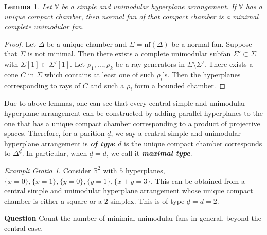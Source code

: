 \documentclass[12pt, a4paper]{article}
\newtheorem{lem}[theorem]{Lemma}
\theoremstyle{definition}
\theoremstyle{remark}
\newtheorem{example}{Exampli Gratia}[section]
\renewcommand{\emph}[1]{\textit{\textbf{#1}}}
\begin{document}
\begin{lem}
    Let $\mathbb{V}$ be a simple and unimodular hyperplane arrangement. If $\mathbb{V}$ has a unique compact chamber, then normal fan of that compact chamber is a minimal complete unimodular fan. 
\end{lem}

\begin{proof}
    Let $\Delta$ be a unique chamber and $\Sigma=\mathrm{nf}(\Delta)$ be a normal fan. Suppose that $\Sigma$ is not minimal. Then there exists a complete unimodular subfan $\Sigma' \subset \Sigma$ with $\Sigma[1] \subset \Sigma'[1]$. Let $\rho_1, \dots, \rho_k$ be a ray generators in $\Sigma \setminus \Sigma'$. There exists a cone $C$ in $\Sigma$ which contains at least one of such $\rho_i$'s. Then the hyperplanes corresponding to rays of $C$ and such a $\rho_i$ form a bounded chamber. 
\end{proof}

Due to above lemmas, one can see that every central simple and unimodular hyperplane arrangement can be constructed by adding parallel hyperplanes to the one that has a unique compact chamber corresponding to a product of projective spaces. Therefore, for a parition $\underline{d}$, we say a central simple and unimodular hyperplane arrangement is \emph{of type $\underline{d}$} is the unique compact chamber corresponds to $\Delta^{\underline{d}}$. In particular, when $\underline{d}=d$, we call it \emph{maximal type}. 

\begin{example}
    Consider $\mathbb{R}^2$ with $5$ hyperplanes, $\{x=0\}, \{x=1\},\{y=0\},\{y=1\},\{x+y=3\}$. This can be obtained from a central simple and unimodular hyperplane arrangement whose unique compact chamber is either a square or a $2$-simplex. This is of type $\underline{d}=d=2$. 
\end{example}

\textbf{Question} Count the number of minimial unimodular fans in general, beyond the central case. 
\end{document}
